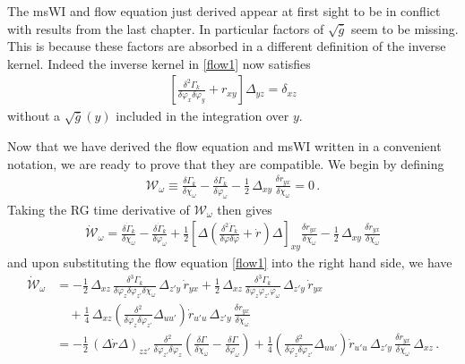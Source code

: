 \documentclass[11pt]{book} %
\numberwithin{equation}{chapter}
\begin{document}
The msWI and flow equation just derived
appear at first sight to be in conflict with results from the last chapter.
In particular factors of $\sqrt{\bar g}$ seem to be missing.
This is because these factors are absorbed in a different definition of the inverse kernel.
Indeed the inverse kernel in \eqref{flow1} now satisfies
\begin{align}
  \left[
    \frac{\delta^{2}\Gamma_k}{\delta\varphi_x \delta\varphi_y}+r_{xy}
  \right] \Delta_{yz} =\delta_{xz}
\end{align}
without a $\sqrt{\bar g}(y)$ included in the integration over $y$.

Now that we have derived the flow equation and msWI written in a convenient notation,
we are ready to prove that they are compatible. We begin by defining
\begin{align}
	\mathcal{W}_\omega\equiv\frac{\delta \Gamma_k}{\delta\chi_\omega}-\frac{\delta \Gamma_k}{\delta\varphi_\omega}
	- \frac{1}{2} \, \Delta_{xy} \, \frac{\delta r_{yx}}{\delta\chi_\omega} =0 \,.
\label{cal-W}
\end{align}
Taking the RG time derivative of $\mathcal{W_\omega}$ then gives
\begin{align}
	\mathcal{\dot W}_\omega= \frac{\delta \dot\Gamma_k}{\delta\chi_\omega}
	-\frac{\delta \dot\Gamma_k}{\delta\varphi_\omega}+
	\frac{1}{2}\left[\Delta\left(\frac{\delta^{2}\dot{\Gamma}_k}{\delta\varphi \delta\varphi}
	+\dot r\right)\Delta\right]_{\!xy}\frac{\delta r_{yx}}{\delta\chi_\omega}
	-\frac{1}{2} \, \Delta_{xy} \, \frac{\delta \dot r_{yx}}{\delta\chi_\omega}
	\label{WIdot}
\end{align}
and upon substituting the flow equation \eqref{flow1} into the right hand side, we have
\begin{align}
  \label{WIdot-2}
	\mathcal{\dot W}_{\omega} &= -\frac{1}{2} \, \Delta_{xz} \,
	\frac{\delta^{3}\Gamma_k}{\delta\varphi_{z}\delta\varphi_{z'}\delta\chi_{\omega}}
  \, \Delta_{z'y} \, \dot r_{yx}
	 + \frac{1}{2} \, \Delta_{xz} \, \frac{\delta^{3}\Gamma_k}{\delta\varphi_{z} \varphi_{z'}\varphi_\omega} \,
   \Delta_{z'y} \, \dot{r}_{yx}
	 \nonumber\\ &\quad
	 + \frac{1}{4} \, \Delta_{xz}
   \left(
     \frac{\delta^{2}}{\delta\varphi_{z}\delta\varphi_{z'}}\Delta_{uu'}
   \right)
	 \dot r_{u'u} \, \Delta_{z'y} \, \frac{\delta r_{yx}}{\delta\chi_{\omega}} \nonumber \\
	&= -\frac{1}{2} \, (\Delta \dot{r} \Delta)_{zz'} \, \frac{\delta^{2}}{\delta\varphi_{z'}\delta\varphi_{z}}
	 \left(\frac{\delta\Gamma}{\delta\chi_\omega}-\frac{\delta\Gamma}{\delta\varphi_\omega}\right)
	  +\frac{1}{4}\left(\frac{\delta^{2}}{\delta\varphi_{z}\delta\varphi_{z'}}\Delta_{uu'}\right)
	 \dot r_{u'u} \, \Delta_{z'y} \, \frac{\delta r_{yx}}{\delta\chi_{\omega}} \, \Delta_{xz} \,.
\end{align}
\end{document}

